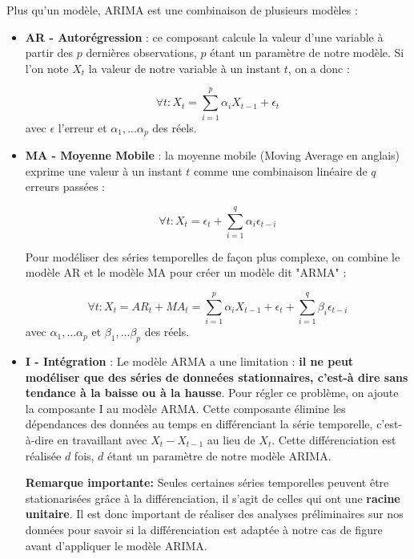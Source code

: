 \documentclass[french]{article}
\begin{document}
    Plus qu'un modèle, ARIMA est une combinaison de plusieurs modèles :
    \begin{itemize}
        \item \textbf{AR - Autorégression} : ce composant calcule la valeur d'une variable à partir des $p$ dernières observations, $p$ étant un paramètre de notre modèle. Si l'on note $X_t$ la valeur de notre variable à un instant $t$, on a donc :

        \begin{equation}\forall t : X_t = \sum_{i=1}^p \alpha_i X_{t-1} + \epsilon_t \end{equation}
        avec $\epsilon$ l'erreur et $\alpha_1,...\alpha_p$ des réels.
        \item \textbf{MA - Moyenne Mobile} : la moyenne mobile (Moving Average en anglais) exprime une valeur à un instant $t$ comme une combinaison linéaire de $q$ erreurs passées :

        \begin{equation}\forall t : X_t = \epsilon_t + \sum_{i=1}^q \alpha_i \epsilon_{t-i} \end{equation}

        Pour modéliser des séries temporelles de façon plus complexe, on combine le modèle AR et le modèle MA pour créer un modèle dit "ARMA" :

        \begin{equation}\forall t : X_t = AR_t + MA_t = \sum_{i=1}^p \alpha_i X_{t-1} + \epsilon_t + \sum_{i=1}^q \beta_i \epsilon_{t-i} \end{equation}
        avec $\alpha_1,...\alpha_p$ et $\beta_1,...\beta_p$ des réels.
        \item \textbf{I - Intégration} : Le modèle ARMA a une limitation : \textbf{il ne peut modéliser que des séries de donneées stationnaires, c'est-à dire sans tendance à la baisse ou à la hausse}. Pour régler ce problème, on ajoute la composante I au modèle ARMA.
        Cette composante élimine les dépendances des données au temps en différenciant la série temporelle, c'est-à-dire en travaillant avec $X_t - X_{t-1}$ au lieu de $X_t$. Cette différenciation est réalisée $d$ fois, $d$ étant un paramètre de notre modèle ARIMA.

        \textbf{Remarque importante: }Seules certaines séries temporelles peuvent être stationarisées grâce à la différenciation, il s'agit de celles qui ont une \textbf{racine unitaire}. Il est donc important de réaliser des analyses préliminaires sur nos données pour savoir si la différenciation est adaptée à notre cas de figure avant d'appliquer le modèle ARIMA.

    \end{itemize}
\end{document}
